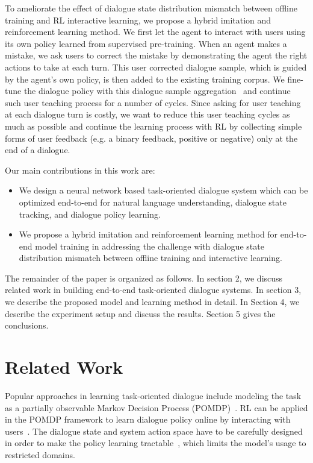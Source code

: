 \documentclass[11pt,a4paper]{article}
\begin{document}
    To ameliorate the effect of dialogue state distribution mismatch between offline training and RL interactive learning, we propose a hybrid imitation and reinforcement learning method. We first let the agent to interact with users using its own policy learned from supervised pre-training. When an agent makes a mistake, we ask users to correct the mistake by demonstrating the agent the right actions to take at each turn. This user corrected dialogue sample, which is guided by the agent's own policy, is then added to the existing training corpus. We fine-tune the dialogue policy with this dialogue sample aggregation~\cite{ross2011reduction} and continue such user teaching process for a number of cycles. Since asking for user teaching at each dialogue turn is costly, we want to reduce this user teaching cycles as much as possible and continue the learning process with RL by collecting simple forms of user feedback (e.g. a binary feedback, positive or negative) only at the end of a dialogue. 

    Our main contributions in this work are:
    \begin{itemize}
        \item We design a neural network based task-oriented dialogue system which can be optimized end-to-end for natural language understanding, dialogue state tracking, and dialogue policy learning.
        \item We propose a hybrid imitation and reinforcement learning method for end-to-end model training in addressing the challenge with dialogue state distribution mismatch between offline training and interactive learning.
    \end{itemize}
    
    The remainder of the paper is organized as follows. In section 2, we discuss related work in building end-to-end task-oriented dialogue systems. In section 3, we describe the proposed model and learning method in detail. In Section 4, we describe the experiment setup and discuss the results. Section 5 gives the conclusions. 

\section{Related Work}
\label{sec:related_work}
    Popular approaches in learning task-oriented dialogue include modeling the task as a partially observable Markov Decision Process (POMDP)~\cite{young2013pomdp}. RL can be applied in the POMDP framework to learn dialogue policy online by interacting with users~\cite{gavsic2013line}. The dialogue state and system action space have to be carefully designed in order to make the policy learning tractable~\cite{young2013pomdp}, which limits the model's usage to restricted domains. 
\end{document}
